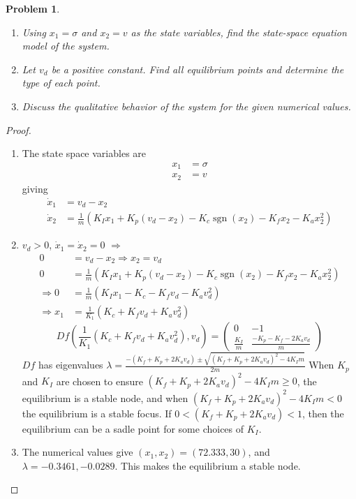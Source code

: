 \documentclass[12pt]{exam}
\DeclareMathOperator{\sgn}{sgn}
\renewenvironment{solution}%
{%
    \renewcommand{\proofname}{Solution}%
    \begin{proof}%
}{\end{proof}}
\theoremstyle{mytheoremstyle}
\newtheorem{problem}{Problem}
\begin{document}
\newpage
\begin{problem}
\begin{enumerate}[label=(P\arabic*)]
    \item Using $x_1 = \sigma$ and $x_2 = v$ as the state variables, find the state-space equation model of the system. 
    \item Let $v_d$ be a positive constant. Find all equilibrium points and determine the type of each point. 
    \item Discuss the qualitative behavior of the system for the given numerical values. 
\end{enumerate}
\end{problem}
\begin{solution}\
\begin{enumerate}[label=(P\arabic*)]
    \item The state space variables are 
    \begin{align*}
        x_1 &= \sigma \\
        x_2 &= v
    \end{align*}
    giving 
    \begin{align*}
        \dot{x}_1 &= v_d - x_2\\
        \dot{x}_2 &= \frac{1}{m}\left( K_I x_1 + K_p (v_d - x_2) -K_c \sgn(x_2) - K_f x_2 - K_a x_2^2\right)
    \end{align*}
    \item $v_d > 0$, $\dot{x}_1 = \dot{x}_2 = 0$ $\Rightarrow$
    \begin{align*}
        0 &= v_d - x_2 \Rightarrow x_2 = v_d\\
        0 &= \frac{1}{m}\left( K_I x_1 + K_p (v_d - x_2) -K_c \sgn(x_2) - K_f x_2 - K_a x_2^2\right)\\
        \Rightarrow 0 &= \frac{1}{m}\left( K_I x_1 - K_c - K_f v_d - K_a v_d^2\right)\\
        \Rightarrow x_1 &= \frac{1}{K_1}\left(K_c + K_f v_d + K_a v_d^2\right)
    \end{align*}
    $$ Df(\frac{1}{K_1}\left(K_c + K_f v_d + K_a v_d^2\right), v_d) = \begin{pmatrix} 0 & -1 \\ \frac{K_I}{m} & \frac{ -K_p - K_f - 2 K_a v_d}{m} \end{pmatrix}$$
    $Df$ has eigenvalues $ \lambda = \frac{-(K_f+K_p+2K_a v_d) \pm \sqrt{(K_f + K_p + 2 K_a v_d)^2 - 4 K_I m}}{2m}$
    When $K_p$ and $K_I$ are chosen to ensure $(K_f + K_p + 2 K_a v_d)^2 - 4 K_I m \geq 0$, the equilibrium is a stable node, and when $(K_f + K_p + 2 K_a v_d)^2 - 4 K_I m < 0$ the equilibrium is a stable focus. If $0 < (K_f + K_p + 2 K_a v_d) < 1$, then the equilibrium can be a sadle point for some choices of $K_I$. 
    \item The numerical values give $(x_1,x_2) = (72.333,30)$, and $ \lambda = -0.3461, -0.0289$. This makes the equilibrium a stable node.
\end{enumerate}
\end{solution}
\end{document}
